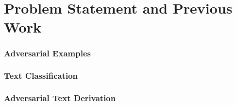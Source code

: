 \chapter{Problem Statement and Previous Work}
\subsection{Adversarial Examples}

\subsection{Text Classification}

\subsection{Adversarial Text Derivation}

